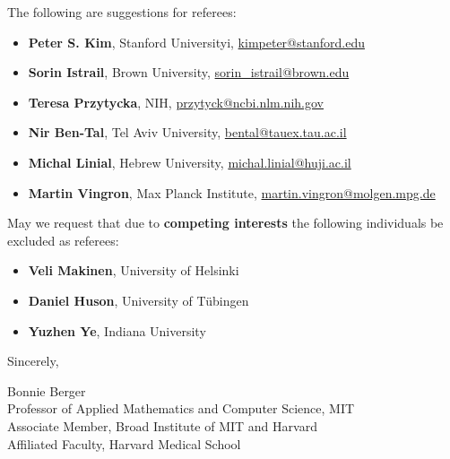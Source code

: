 \documentclass{article}
\newcommand{\email}[1]{\href{mailto:#1}{#1} }
\begin{document}
The following are suggestions for referees:
\begin{itemize}
\item[] \textbf{Peter S. Kim}, Stanford Universityi, \email{kimpeter@stanford.edu} %
\item[] \textbf{Sorin Istrail}, Brown University, \email{sorin\_istrail@brown.edu}  %
\item[] \textbf{Teresa Przytycka}, NIH, \email{przytyck@ncbi.nlm.nih.gov}  %
\item[] \textbf{Nir Ben-Tal}, Tel Aviv University, \email{bental@tauex.tau.ac.il} %
\item[] \textbf{Michal Linial}, Hebrew University, \email{michal.linial@huji.ac.il}
\item[] \textbf{Martin Vingron}, Max Planck Institute, \email{martin.vingron@molgen.mpg.de}
\end{itemize}

May we request that due to \textbf{competing interests} the following individuals be excluded as referees:
\begin{itemize}
\item[] \textbf{Veli Makinen}, University of Helsinki
\item[] \textbf{Daniel Huson}, University of T\"ubingen
\item[] \textbf{Yuzhen Ye}, Indiana University
\end{itemize}


Sincerely,

Bonnie Berger  \\
Professor of Applied Mathematics and Computer Science, MIT  \\
Associate Member, Broad Institute of MIT and Harvard \\
Affiliated Faculty, Harvard Medical School
\end{document}
